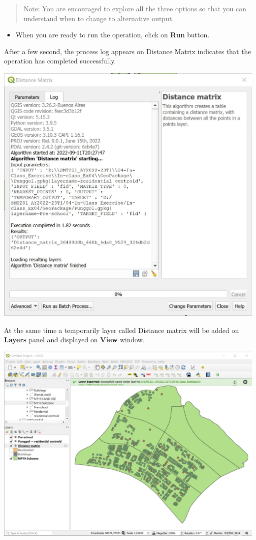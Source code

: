 \documentclass[
  letterpaper,
  DIV=11,
  numbers=noendperiod]{scrreprt}
\providecommand{\tightlist}{%
  \setlength{\itemsep}{0pt}\setlength{\parskip}{0pt}}\usepackage{longtable,booktabs,array}
\begin{document}
\begin{quote}
Note: You are encouraged to explore all the three options so that you
can understand when to change to alternative output.
\end{quote}

\begin{itemize}
\tightlist
\item
  When you are ready to run the operation, click on \textbf{Run} button.
\end{itemize}

After a few second, the process log appears on Distance Matrix indicates
that the operation has completed successfully.

\includegraphics{./img04/image119.jpg}

At the same time a temporarily layer called Distance matrix will be
added on \textbf{Layers} panel and displayed on \textbf{View} window.

\includegraphics{./img04/image120.jpg}
\end{document}
